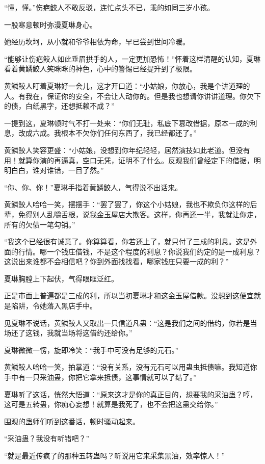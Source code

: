 \begin{this_body}
“懂，懂。”伤疤鲛人不敢反驳，连忙点头不已，乖的如同三岁小孩。

一股寒意顿时弥漫夏琳身心。

她经历坎坷，从小就和爷爷相依为命，早已尝到世间冷暖。

“能够让伤疤鲛人如此垂眉拱手的人，一定更加恐怖！”怀着这样清醒的认知，夏琳看着黄鳞鲛人笑眯眯的神色，心中的警惕已经提升到了极限。

黄鳞鲛人盯着夏琳好一会儿，这才开口道：“小姑娘，你放心，我是个讲道理的人。有我在，保证你的安全，不会让人动你的。但是我也想请你讲讲道理。你欠下的债，白纸黑字，还想抵赖不成？”

一提到这，夏琳顿时气不打一处来：“你们无耻，私底下篡改借据，原本一成的利息，改成六成。我根本不欠你们任何东西了，我已经都还了。”

黄鳞鲛人笑容更盛：“小姑娘，没想到你年纪轻轻，居然演技如此老道。但没有用！就算你演的再逼真，空口无凭，证明不了什么。反观我们曾经定下的借据，明明白白，谁对谁错，一目了然。”

“你、你、你！”夏琳手指着黄鳞鲛人，气得说不出话来。

黄鳞鲛人哈哈一笑，摆摆手：“罢了罢了，你这个小姑娘，我也不欺负你这样的后辈，免得别人乱嚼舌根，说我金玉屋店大欺客。这样，你再还一半，我就让你走，所有的欠债一笔勾销。”

“我这个已经很有诚意了。你算算看，你若还上了，就只付了三成的利息。这是外面的行情。哪一个钱庄借钱，不是这个程度的利息？你说我们约定的是一成利息？这说出来谁都不会相信吧？你到外面找找看，哪家钱庄只要一成的利？”

夏琳胸膛上下起伏，气得眼眶泛红。

正是市面上普遍都是三成的利，所以当初夏琳才和这金玉屋借款。没想到这便宜就是陷阱，令她落入黑店手中。

见夏琳不说话，黄鳞鲛人又取出一只信道凡蛊：“这是我们之间的借约，你若是当场还了这钱，我就当场将这借约还给你。”

夏琳微微一愣，旋即冷笑：“我手中可没有足够的元石。”

黄鳞鲛人哈哈一笑，拍掌道：“没有关系，没有元石可以用蛊虫抵债嘛。我知道你手中有一只采油蛊，你把它拿来抵债，这事情就可以了结了。”

夏琳听了这话，恍然大悟道：“原来这才是你的真正目的，想要我的采油蛊？哼，这可是五转蛊，你痴心妄想！就算是我死了，也不会把这蛊交给你。”

围观的蛊师们听到这番话，顿时骚动起来。

“采油蛊？我没有听错吧？”

“就是最近传疯了的那种五转蛊吗？听说用它来采集黑油，效率惊人！”


\end{this_body}
